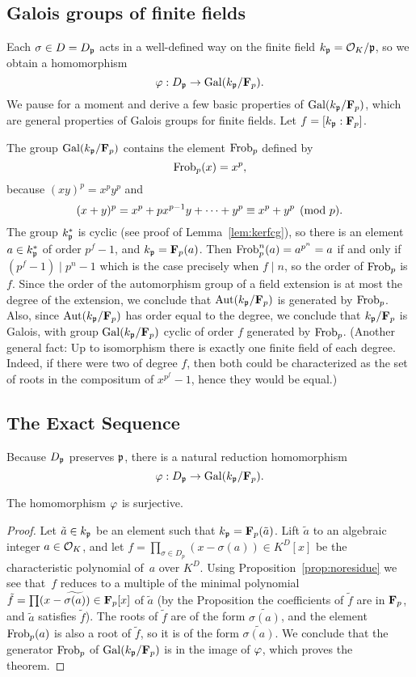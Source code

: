 \subsection{Galois groups of finite fields}\label{sec:galoisfinite}
Each $\sigma\in D=D_{\mathfrak{p}}$ acts in a well-defined
way on the finite field $ k_{\mathfrak{p}} = \mathcal{O}_K/\mathfrak{p}$, so we obtain
a homomorphism 
$$
  \varphi:D_{\mathfrak{p}} \to \operatorname{Gal}(k_{\mathfrak{p}}/\mathbf{F}_p).
$$
We pause for a moment and derive a few basic properties of $\operatorname{Gal}(k_{\mathfrak{p}}/\mathbf{F}_p)$,
which are general properties of Galois groups for finite fields. 
Let $f=[ k_{\mathfrak{p}}:\mathbf{F}_p]$.

The group $\operatorname{Gal}(k_{\mathfrak{p}}/\mathbf{F}_p)$ contains the element $\operatorname{Frob}_p$ defined by
$$\operatorname{Frob}_p(x) = x^p,$$ 
because $(xy)^p = x^p y^p$  and
$$(x+y)^p = x^p + px^{p-1}y + \cdots + y^p \equiv
 x^p+y^p\pmod{p}.$$ 
The group
$ k_{\mathfrak{p}}^*$ is cyclic (see proof of Lemma~\ref{lem:kerfcg}), 
so there is an element $a\in k_{\mathfrak{p}}^*$ of order
$p^f-1$, and $ k_{\mathfrak{p}}=\mathbf{F}_p(a)$.  Then $\operatorname{Frob}_p^n(a) = a^{p^n} = a$ if
and only if $(p^f-1)\mid p^n-1$ which is the case precisely when
$f\mid n$, so the order of $\operatorname{Frob}_p$ is~$f$.  Since the order of the
automorphism group of a field extension is at most the degree of the
extension, we conclude that $\operatorname{Aut}(k_{\mathfrak{p}}/\mathbf{F}_p)$ is generated by $\operatorname{Frob}_p$.  Also,
since $\operatorname{Aut}(k_{\mathfrak{p}}/\mathbf{F}_p)$ has order equal to the degree, we conclude that
$ k_{\mathfrak{p}}/\mathbf{F}_p$ is Galois, with group $\operatorname{Gal}(k_{\mathfrak{p}}/\mathbf{F}_p)$ cyclic of order $f$
generated by $\operatorname{Frob}_p$.  (Another general fact: Up to isomorphism
there is exactly one finite field of each degree.  Indeed, if there
were two of degree $f$, then both could be characterized as the set of
roots in the compositum of $x^{p^f}-1$, hence they would be equal.)

\subsection{The Exact Sequence}\label{sec:exactseq}
Because $D_{\mathfrak{p}}$ preserves $\mathfrak{p}$, there is a natural reduction homomorphism
$$
  \varphi:D_{\mathfrak{p}} \to \operatorname{Gal}(k_{\mathfrak{p}}/\mathbf{F}_p).
$$
\begin{theorem}\label{thm:redsurj}
The homomorphism $\varphi$ is surjective.
\end{theorem}
\begin{proof}
Let $\tilde{a} \in  k_{\mathfrak{p}}$ be an element such that $ k_{\mathfrak{p}} = \mathbf{F}_p(\tilde{a})$. 
Lift $\tilde{a}$ to an algebraic integer $a\in \mathcal{O}_K$, and let
$f=\prod_{\sigma\in D_p}(x-\sigma(a))\in K^D[x]$ be the characteristic polynomial of~$a$ over $K^D$.
Using Proposition~\ref{prop:noresidue} we see that~$f$ 
reduces to a multiple of the minimal polynomial $\tilde{f}=\prod (x-\widetilde{\sigma(a)})\in \mathbf{F}_p[x]$
of $\tilde{a}$ (by the Proposition the coefficients of $\tilde{f}$
are in $\mathbf{F}_p$, and $\tilde{a}$ satisfies $\tilde{f}$).  
The roots of $\tilde{f}$ are of the form 
$\widetilde{\sigma(a)}$, and
the element $\operatorname{Frob}_p(a)$ is also a root of
$\tilde{f}$, so it is of the form $\widetilde{\sigma(a)}$.
We conclude that the generator $\operatorname{Frob}_p$ of $\operatorname{Gal}(k_{\mathfrak{p}}/\mathbf{F}_p)$ is
in the image of $\varphi$, which proves the theorem. 
\end{proof}

